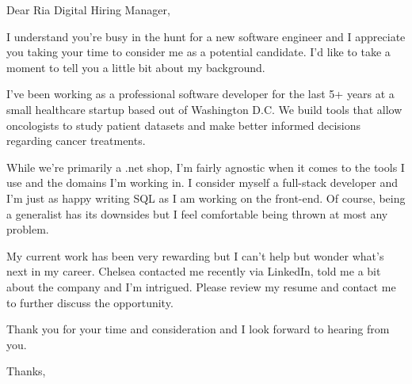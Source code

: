 \documentclass{letter}
\begin{document}
\begin{letter} {}
\opening{Dear Ria Digital Hiring Manager,}
 
I understand you're busy in the hunt for a new software engineer and I appreciate you taking your time to consider me as a potential candidate. I'd like to take a moment to tell you a little bit about my background. 
	
I've been working as a professional software developer for the last 5+ years at a small healthcare startup based out of Washington D.C. We build tools that allow oncologists to study patient datasets and make better informed decisions regarding cancer treatments.

While we're primarily a .net shop, I'm fairly agnostic when it comes to the tools I use and the domains I'm working in. I consider myself a full-stack developer and I'm just as happy writing SQL as I am working on the front-end. Of course, being a generalist has its downsides but I feel comfortable being thrown at most any problem.

My current work has been very rewarding but I can't help but wonder what's next in my career. Chelsea contacted me recently via LinkedIn, told me a bit about the company and I'm intrigued. Please review my resume and contact me to further discuss the opportunity.
 
Thank you for your time and consideration and I look forward to hearing from you.
 
\closing{Thanks,}

\end{letter}
 
\end{document}
